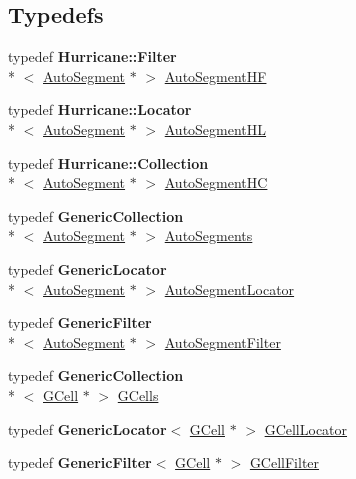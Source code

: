 \subsection*{Typedefs}
\begin{DoxyCompactItemize}
\item 
typedef {\bf Hurricane\-::\-Filter}\\*
$<$ \hyperlink{classKatabatic_1_1AutoSegment}{Auto\-Segment} $\ast$ $>$ \hyperlink{namespaceKatabatic_a790418bb65a9a13859868df3e8f53598}{Auto\-Segment\-H\-F}
\item 
typedef {\bf Hurricane\-::\-Locator}\\*
$<$ \hyperlink{classKatabatic_1_1AutoSegment}{Auto\-Segment} $\ast$ $>$ \hyperlink{namespaceKatabatic_a40ef13471fd0e797b75d3c436813fe65}{Auto\-Segment\-H\-L}
\item 
typedef {\bf Hurricane\-::\-Collection}\\*
$<$ \hyperlink{classKatabatic_1_1AutoSegment}{Auto\-Segment} $\ast$ $>$ \hyperlink{namespaceKatabatic_acb3628dc7705fefe38a665cfe43efa6e}{Auto\-Segment\-H\-C}
\item 
typedef {\bf Generic\-Collection}\\*
$<$ \hyperlink{classKatabatic_1_1AutoSegment}{Auto\-Segment} $\ast$ $>$ \hyperlink{namespaceKatabatic_a2221b0ddbc24f331809fc86f98e38041}{Auto\-Segments}
\item 
typedef {\bf Generic\-Locator}\\*
$<$ \hyperlink{classKatabatic_1_1AutoSegment}{Auto\-Segment} $\ast$ $>$ \hyperlink{namespaceKatabatic_ace866cc8e09faf80f71a4087bb8e5870}{Auto\-Segment\-Locator}
\item 
typedef {\bf Generic\-Filter}\\*
$<$ \hyperlink{classKatabatic_1_1AutoSegment}{Auto\-Segment} $\ast$ $>$ \hyperlink{namespaceKatabatic_a13ffc994c98e1a878e61a927de0509c8}{Auto\-Segment\-Filter}
\item 
typedef {\bf Generic\-Collection}\\*
$<$ \hyperlink{classKatabatic_1_1GCell}{G\-Cell} $\ast$ $>$ \hyperlink{namespaceKatabatic_ab68f9dfbbc79fd999773beef8561bc31}{G\-Cells}
\item 
typedef {\bf Generic\-Locator}$<$ \hyperlink{classKatabatic_1_1GCell}{G\-Cell} $\ast$ $>$ \hyperlink{namespaceKatabatic_ae192ef170a0ad390902e435ac1e6796a}{G\-Cell\-Locator}
\item 
typedef {\bf Generic\-Filter}$<$ \hyperlink{classKatabatic_1_1GCell}{G\-Cell} $\ast$ $>$ \hyperlink{namespaceKatabatic_a7d07e23d45818a2ae5f6881ce0ec7403}{G\-Cell\-Filter}
\end{DoxyCompactItemize}
